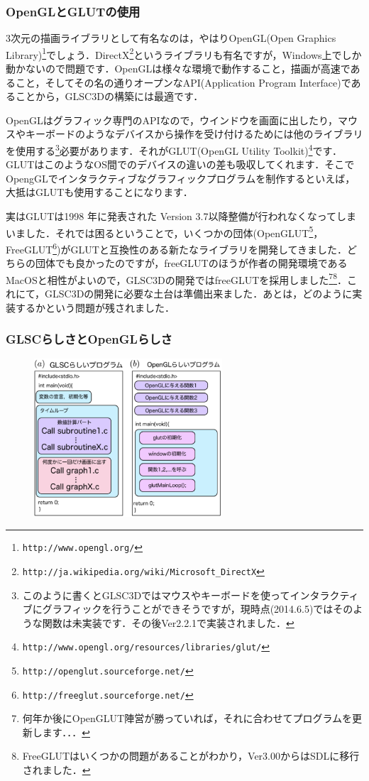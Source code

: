 \documentclass[platex,a4paper,12pt]{jsarticle}%
\begin{document}
\subsubsection{OpenGLとGLUTの使用}
3次元の描画ライブラリとして有名なのは，やはりOpenGL(Open Graphics Library)\footnote{\verb|http://www.opengl.org/|}でしょう．DirectX\footnote{\verb|http://ja.wikipedia.org/wiki/Microsoft_DirectX|}というライブラリも有名ですが，Windows上でしか動かないので問題です．OpenGLは様々な環境で動作すること，描画が高速であること，そしてその名の通りオープンなAPI(Application Program Interface)であることから，GLSC3Dの構築には最適です．

OpenGLはグラフィック専門のAPIなので，ウインドウを画面に出したり，マウスやキーボードのようなデバイスから操作を受け付けるためには他のライブラリを使用する\footnote{このように書くとGLSC3Dではマウスやキーボードを使ってインタラクティブにグラフィックを行うことができそうですが，現時点(2014.6.5)ではそのような関数は未実装です．その後Ver2.2.1で実装されました．}必要があります．それがGLUT(OpenGL Utility Toolkit)\footnote{\verb|http://www.opengl.org/resources/libraries/glut/|}です．GLUTはこのようなOS間でのデバイスの違いの差も吸収してくれます．そこでOpengGLでインタラクティブなグラフィックプログラムを制作するといえば，大抵はGLUTも使用することになります．

実はGLUTは1998 年に発表された Version 3.7以降整備が行われなくなってしまいました．それでは困るということで，いくつかの団体(OpenGLUT\footnote{\verb|http://openglut.sourceforge.net/|}，FreeGLUT\footnote{\verb|http://freeglut.sourceforge.net/|})がGLUTと互換性のある新たなライブラリを開発してきました．どちらの団体でも良かったのですが，freeGLUTのほうが作者の開発環境であるMacOSと相性がよいので，GLSC3Dの開発ではfreeGLUTを採用しました\footnote{何年か後にOpenGLUT陣営が勝っていれば，それに合わせてプログラムを更新します．．．}\footnote{FreeGLUTはいくつかの問題があることがわかり，Ver3.00からはSDLに移行されました．}．これにて，GLSC3Dの開発に必要な土台は準備出来ました．あとは，どのように実装するかという問題が残されました．

\subsubsection{GLSCらしさとOpenGLらしさ}

\begin{figure}
\vspace{-1\baselineskip}
	\includegraphics[width=70mm]{002.eps}
\end{figure}
\end{document}
